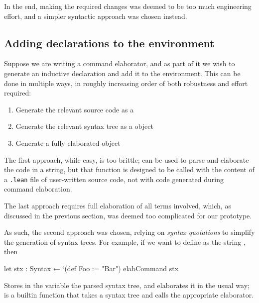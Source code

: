 In the end, making the required changes was deemed to be too much engineering effort, and a simpler syntactic approach was chosen instead.



\subsection{Adding declarations to the environment}
Suppose we are writing a command elaborator, and as part of it we wish to generate an inductive declaration and add it to the environment. This can be done in multiple ways, in roughly increasing order of both robustness and effort required:
\begin{enumerate}
    \item Generate the relevant source code as a 
    \item Generate the relevant syntax tree as a  object
    \item Generate a fully elaborated  object
\end{enumerate}

The first approach, while easy, is too brittle;  can be used to parse and elaborate the code in a string, but that function is designed to be called with the content of a \texttt{.lean} file of user-written source code, not with code generated during command elaboration.

The last approach requires full elaboration of all terms involved, which, as discussed in the previous section, was deemed too complicated for our prototype.

As such, the second approach was chosen, relying on \emph{syntax quotations} to simplify the generation of syntax trees. 
For example, if we want to define  as the string , then
\begin{leancode}
    let stx : Syntax ← `(def Foo := "Bar")
    elabCommand stx
\end{leancode}
Stores in the variable  the parsed syntax tree, and elaborates it in the usual way;  is a builtin function  that takes a  syntax tree and calls the appropriate elaborator.


